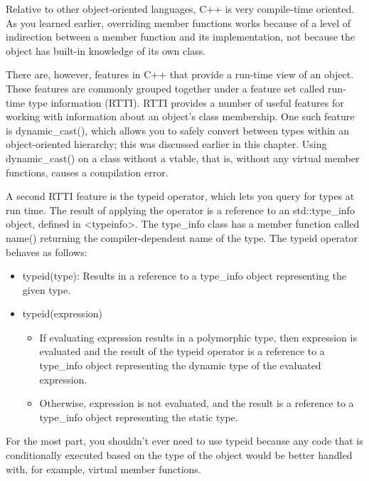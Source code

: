 
Relative to other object-oriented languages, C++ is very compile-time oriented. As you learned earlier, overriding member functions works because of a level of indirection between a member function and its implementation, not because the object has built-in knowledge of its own class.

There are, however, features in C++ that provide a run-time view of an object. These features are commonly grouped together under a feature set called run-time type information (RTTI). RTTI provides a number of useful features for working with information about an object’s class membership. One such feature is dynamic\_cast(), which allows you to safely convert between types within an object-oriented hierarchy; this was discussed earlier in this chapter. Using dynamic\_cast() on a class without a vtable, that is, without any virtual member functions, causes a compilation error.

A second RTTI feature is the typeid operator, which lets you query for types at run time. The result of applying the operator is a reference to an std::type\_info object, defined in <typeinfo>. The type\_info class has a member function called name() returning the compiler-dependent name of the type. The typeid operator behaves as follows:

\begin{itemize}
\item
typeid(type): Results in a reference to a type\_info object representing the given type.

\item
typeid(expression)
\begin{itemize}
\item
If evaluating expression results in a polymorphic type, then expression is evaluated and the result of the typeid operator is a reference to a type\_info object representing the dynamic type of the evaluated expression.

\item
Otherwise, expression is not evaluated, and the result is a reference to a type\_info object representing the static type.
\end{itemize}
\end{itemize}

For the most part, you shouldn’t ever need to use typeid because any code that is conditionally executed based on the type of the object would be better handled with, for example, virtual member functions.

